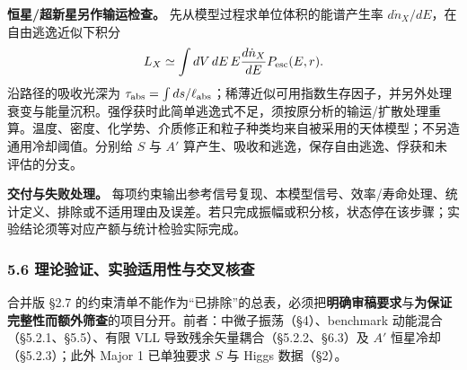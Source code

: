 \documentclass[
]{article}
\begin{document}
\textbf{恒星/超新星另作输运检查。} 先从模型过程求单位体积的能谱产生率
\(d\dot n_X/dE\)，在自由逃逸近似下积分 \[
L_X\simeq\int dV\,dE\,E\frac{d\dot n_X}{dE}P_{\rm esc}(E,r).
\] 沿路径的吸收光深为
\(\tau_{\rm abs}=\int ds/\ell_{\rm abs}\)；稀薄近似可用指数生存因子，并另外处理衰变与能量沉积。强俘获时此简单逃逸式不足，须按原分析的输运/扩散处理重算。温度、密度、化学势、介质修正和粒子种类均来自被采用的天体模型；不另造通用冷却阈值。分别给
\(S\) 与 \(A'\) 算产生、吸收和逃逸，保存自由逃逸、俘获和未评估的分支。

\textbf{交付与失败处理。}
每项约束输出参考信号复现、本模型信号、效率/寿命处理、统计定义、排除或不适用理由及误差。若只完成振幅或积分核，状态停在该步骤；实验结论须等对应产额与统计检验实际完成。

\subsubsection{5.6
理论验证、实验适用性与交叉核查}\label{ux7406ux8bbaux9a8cux8bc1ux5b9eux9a8cux9002ux7528ux6027ux4e0eux4ea4ux53c9ux6838ux67e5-3}

合并版 §2.7
的约束清单不能作为``已排除''的总表，必须把\textbf{明确审稿要求}与\textbf{为保证完整性而额外筛查}的项目分开。前者：中微子振荡（§4）、benchmark
动能混合（§5.2.1、§5.5）、有限 VLL 导致残余矢量耦合（§5.2.2、§6.3）及
\(A'\) 恒星冷却（§5.2.3）；此外 Major 1 已单独要求 \(S\) 与 Higgs
数据（§2）。
\end{document}
